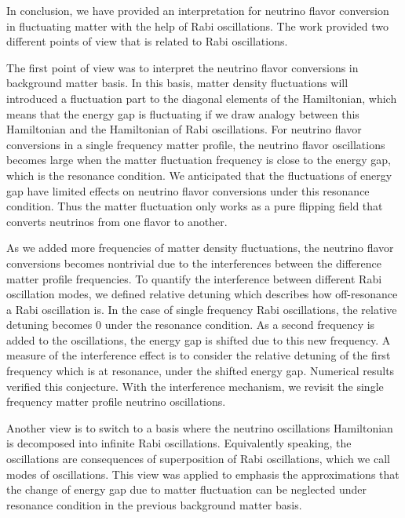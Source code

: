 In conclusion, we have provided an interpretation for neutrino flavor conversion in fluctuating matter with the help of Rabi oscillations. The work provided two different points of view that is related to Rabi oscillations.

The first point of view was to interpret the neutrino flavor conversions in background matter basis. In this basis, matter density fluctuations will introduced a fluctuation part to the diagonal elements of the Hamiltonian, which means that the energy gap is fluctuating if we draw analogy between this Hamiltonian and the Hamiltonian of Rabi oscillations. For neutrino flavor conversions in a single frequency matter profile, the neutrino flavor oscillations becomes large when the matter fluctuation frequency is close to the energy gap, which is the resonance condition. We anticipated that the fluctuations of energy gap have limited effects on neutrino flavor conversions under this resonance condition. Thus the matter fluctuation only works as a pure flipping field that converts neutrinos from one flavor to another.

As we added more frequencies of matter density fluctuations, the neutrino flavor conversions becomes nontrivial due to the interferences between the difference matter profile frequencies. To quantify the interference between different Rabi oscillation modes, we defined relative detuning which describes how off-resonance a Rabi oscillation is. In the case of single frequency Rabi oscillations, the relative detuning becomes $0$ under the resonance condition. As a second frequency is added to the oscillations, the energy gap is shifted due to this new frequency. A measure of the interference effect is to consider the relative detuning of the first frequency which is at resonance, under the shifted energy gap. Numerical results verified this conjecture. With the interference mechanism, we revisit the single frequency matter profile neutrino oscillations.

Another view is to switch to a basis where the neutrino oscillations Hamiltonian is decomposed into infinite Rabi oscillations. Equivalently speaking, the oscillations are consequences of superposition of Rabi oscillations, which we call modes of oscillations. This view was applied to emphasis the approximations that the change of energy gap due to matter fluctuation can be neglected under resonance condition in the previous background matter basis.












